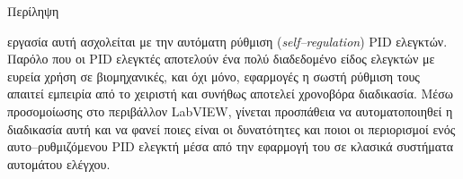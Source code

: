 \pagestyle{plain}
\begin{center}
{\LARGE Περίληψη}\\[1cm]
\end{center}


\lettrine[findent=2pt]{}{ } εργασία αυτή ασχολείται με την αυτόματη ρύθμιση (\emph{self--regulation}) PID ελεγκτών. Παρόλο που οι PID ελεγκτές αποτελούν ένα πολύ διαδεδομένο είδος ελεγκτών με ευρεία χρήση σε βιομηχανικές, και όχι μόνο, εφαρμογές η σωστή ρύθμιση τους απαιτεί εμπειρία από το χειριστή και συνήθως αποτελεί χρονοβόρα διαδικασία. Μέσω προσομοίωσης στο περιβάλλον LabVIEW, γίνεται προσπάθεια να αυτοματοποιηθεί η διαδικασία αυτή και να φανεί ποιες είναι οι δυνατότητες και ποιοι οι περιορισμοί ενός αυτο--ρυθμιζόμενου PID ελεγκτή μέσα από την εφαρμογή του σε κλασικά συστήματα αυτομάτου ελέγχου.